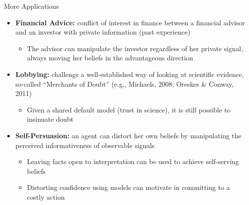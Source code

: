\documentclass[aspectratio=169]{beamer}
\theoremstyle{definition}
\theoremstyle{plain}
\theoremstyle{plain}
\theoremstyle{definition}
\theoremstyle{plain}
\theoremstyle{plain}
\theoremstyle{plain}
\theoremstyle{plain}
\theoremstyle{remark}
\theoremstyle{definition}
\begin{document}
\begin{frame}[label=SP]{More Applications}
  \begin{itemize}
    \item \textbf{Financial Advice:} conflict of interest in finance between a financial advisor and an investor with private information (past experience)
      \begin{itemize}
        \item The advisor can manipulate the investor regardless of her private signal, always moving her beliefs in the advantageous direction
      \end{itemize}
    \item \textbf{Lobbying:} challenge a well-established way of looking at scientific evidence, so-called ``Merchants of Doubt'' (e.g., Michaels, 2008; Oreskes \& Conway, 2011)
      \begin{itemize}
        \item Given a shared default model (trust in science), it is still possible to insinuate doubt
      \end{itemize}
    \item \textbf{Self-Persuasion:} an agent can distort her own beliefs by manipulating the perceived informativeness of observable signals
      \begin{itemize}
        \item Leaving facts open to interpretation can be used to achieve self-serving beliefs
        \item Distorting confidence using models can motivate in committing to a costly action
      \end{itemize}
  \end{itemize}
\end{frame}
\end{document}
